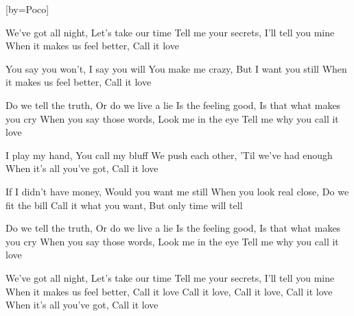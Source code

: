 
[by=Poco]


\beginverse
We've got all night, Let's take our time
Tell me your secrets, I'll tell you mine
When it makes us feel better, Call it love
\endverse

\beginverse
You say you won't, I say you will
You make me crazy, But I want you still
When it makes us feel better, Call it love
\endverse

\beginverse
Do we tell the truth, Or do we live a lie
Is the feeling good, Is that what makes you cry
When you say those words, Look me in the eye
Tell me why you call it love
\endverse

\beginverse
I play my hand, You call my bluff
We push each other, 'Til we've had enough
When it's all you've got, Call it love
\endverse

\beginverse
If I didn't have money, Would you want me still
When you look real close, Do we fit the bill
Call it what you want, But only time will tell
\endverse

\beginverse
Do we tell the truth, Or do we live a lie
Is the feeling good, Is that what makes you cry
When you say those words, Look me in the eye
Tell me why you call it love
\endverse

\beginverse
We've got all night, Let's take our time
Tell me your secrets, I'll tell you mine
When it makes us feel better, Call it love
Call it love, Call it love, Call it love
When it's all you've got, Call it love
\endverse


\endsong

